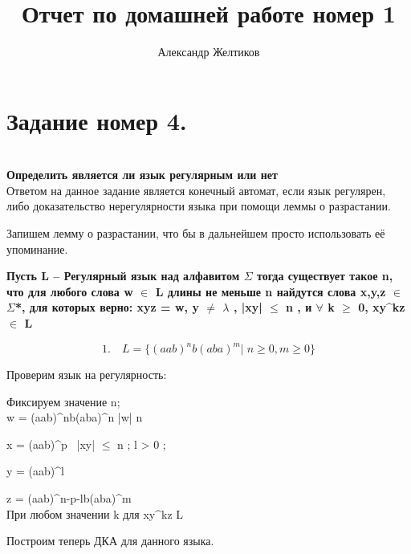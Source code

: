 \documentclass[fleqn]{article}
\title{Отчет по домашней работе номер 1}
\author{Александр Желтиков}
\begin{document}
\chapter{\textbf{\large{Задание номер 4.}}} \\
\textbf{Определить является ли язык регулярным или нет}
\\
Ответом на данное задание является конечный автомат, если язык регулярен, либо доказательство нерегулярности языка при помощи леммы о
разрастании.

Запишем лемму о разрастании, что бы в дальнейшем просто использовать её упоминание.

    \textbf{Пусть L -- Регулярный язык над алфавитом $\Sigma$ тогда существует такое n, что для любого слова w $\in$ L длины не меньше n найдутся слова x,y,z $\in$ $\Sigma$*, для которых верно: xyz = w, y $\neq$ $\lambda$ , |xy| $\leq$ n , и $\forall$ k $\geq$ 0, xy^kz $\in$ L}



\begin{equation}
1. \quad L = \{(aab)^nb(aba)^m | \; n \geq 0, m \geq 0 \}    \nonumber
\end{equation}

Проверим язык на регулярность:

Фиксируем значение n;\\
w = (aab)^nb(aba)^n   \qquad  |w| \geq n

x = (aab)^p  \qquad\qquad \ |xy| $\leq$ n  ; \; l > 0 ;

y = (aab)^l

z = (aab)^{n-p-l}b(aba)^m
\\

При любом значении k для xy^kz \in L

Построим теперь ДКА для данного языка.

\end{document}
